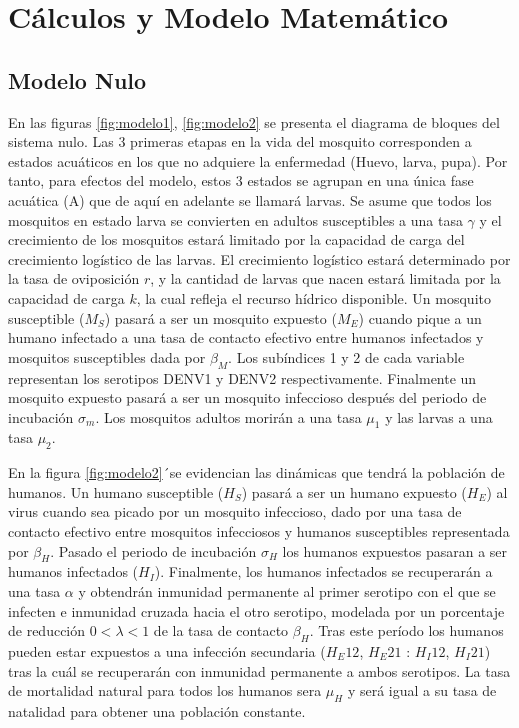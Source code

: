 \documentclass[journal]{IEEEtran}
\begin{document}
\section{Cálculos y Modelo Matemático}

\subsection{Modelo Nulo}
En las figuras \ref{fig:modelo1}, \ref{fig:modelo2}  se presenta el diagrama de bloques del sistema nulo. Las 3 primeras etapas en la vida del mosquito corresponden a estados acuáticos en los que no adquiere la enfermedad (Huevo, larva, pupa). Por tanto, para efectos del modelo, estos 3 estados se agrupan en una única fase acuática (A) que de aquí en adelante se llamará larvas. Se asume que todos los mosquitos en estado larva se convierten en adultos susceptibles a una tasa $\gamma$ y el crecimiento de los mosquitos estará limitado por la capacidad de carga del crecimiento logístico de las larvas. El crecimiento logístico estará determinado por la tasa de oviposición $r$, y la cantidad de larvas que nacen estará limitada por la capacidad de carga $k$, la cual refleja el recurso hídrico disponible. Un mosquito susceptible ($M_S$) pasará a ser un mosquito expuesto ($M_E$) cuando pique a un humano infectado a una tasa de contacto efectivo entre humanos infectados y mosquitos susceptibles dada por $\beta_M$. Los subíndices 1 y 2 de cada variable representan los serotipos DENV1 y DENV2 respectivamente. Finalmente un mosquito expuesto pasará a ser un mosquito infeccioso después del periodo de incubación $\sigma_m$. Los mosquitos adultos morirán a una tasa $\mu_1$ y las larvas a una tasa $\mu_2$.

En la figura \ref{fig:modelo2}´se evidencian las dinámicas que tendrá la población de humanos. Un humano susceptible ($H_S$) pasará a ser un humano expuesto ($H_E$) al virus cuando sea picado por un mosquito infeccioso, dado por una tasa de contacto efectivo entre mosquitos infecciosos y humanos susceptibles representada por  $\beta_H$. Pasado el periodo de incubación  $\sigma_H$ los humanos expuestos pasaran a ser humanos infectados ($H_I$). Finalmente, los humanos infectados se recuperarán a una tasa $\alpha$ y obtendrán inmunidad permanente al primer serotipo con el que se infecten e inmunidad cruzada hacia el otro serotipo, modelada por un porcentaje de reducción $0<\lambda<1$ de la tasa de contacto $\beta_H$. Tras este período los humanos pueden estar expuestos a una infección secundaria ($H_E12$, $H_E21$ : $H_I12$, $H_I21$) tras la cuál se recuperarán con inmunidad permanente a ambos serotipos. La tasa de mortalidad natural para todos los humanos sera $\mu_H$ y será igual a su tasa de natalidad para obtener una población constante.
\end{document}
